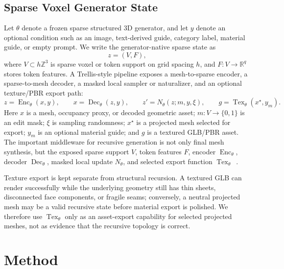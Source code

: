 \subsection{Sparse Voxel Generator State}
Let $\theta$ denote a frozen sparse structured 3D generator, and let $y$ denote an optional condition such as an image, text-derived guide, category label, material guide, or empty prompt. We write the generator-native sparse state as
\[
z=(V,F),
\]
where $V\subset h\mathbb Z^3$ is sparse voxel or token support on grid spacing $h$, and $F:V\rightarrow\mathbb R^q$ stores token features. A Trellis-style pipeline exposes a mesh-to-sparse encoder, a sparse-to-mesh decoder, a masked local sampler or naturalizer, and an optional texture/PBR export path:
\[
z=\operatorname{Enc}_{\theta}(x,y),
\qquad
x=\operatorname{Dec}_{\theta}(z,y),
\qquad
z'=N_{\theta}(z;m,y,\xi),
\qquad
g=\operatorname{Tex}_{\theta}(x^\star,y_m).
\]
Here $x$ is a mesh, occupancy proxy, or decoded geometric asset; $m:V\rightarrow\{0,1\}$ is an edit mask; $\xi$ is sampling randomness; $x^\star$ is a projected mesh selected for export; $y_m$ is an optional material guide; and $g$ is a textured GLB/PBR asset. The important middleware for recursive generation is not only final mesh synthesis, but the exposed sparse support $V$, token features $F$, encoder $\operatorname{Enc}_{\theta}$, decoder $\operatorname{Dec}_{\theta}$, masked local update $N_{\theta}$, and selected export function $\operatorname{Tex}_{\theta}$~\cite{trellis2024,trellis2project}. 

Texture export is kept separate from structural recursion. A textured GLB can render successfully while the underlying geometry still has thin sheets, disconnected face components, or fragile seams; conversely, a neutral projected mesh may be a valid recursive state before material export is polished. We therefore use $\operatorname{Tex}_{\theta}$ only as an asset-export capability for selected projected meshes, not as evidence that the recursive topology is correct.


\section{Method}

